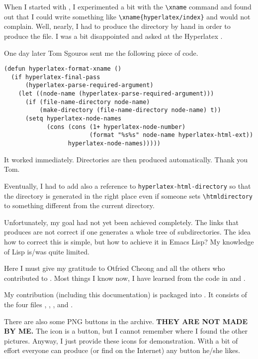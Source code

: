 When I started with \HLX{}, I experimented a bit with the
\verb'\xname' command and found out that I could write something like
\verb'\xname{hyperlatex/index}' and \HLX{} would not complain. Well,
nearly, I had to produce the directory  by hand in
order to produce the  file.
%
I was a bit disappointed and asked at the Hyperlatex
.

One day later Tom Sgouros sent me the following piece of code.
\begin{verbatim}
(defun hyperlatex-format-xname ()
  (if hyperlatex-final-pass
      (hyperlatex-parse-required-argument)
    (let ((node-name (hyperlatex-parse-required-argument)))
      (if (file-name-directory node-name)
          (make-directory (file-name-directory node-name) t))
      (setq hyperlatex-node-names
            (cons (cons (1+ hyperlatex-node-number)
                        (format "%s%s" node-name hyperlatex-html-ext))
                  hyperlatex-node-names)))))
\end{verbatim}
It worked immediately. Directories are then produced automatically.
Thank you Tom.

Eventually, I had to add also a reference to
\verb'hyperlatex-html-directory' so that the directory is generated in
the right place even if someone sets \verb'\htmldirectory' to
something different from the current directory.

Unfortunately, my goal had not yet been achieved completely. The links
that \HLX{} produces are not correct if one generates a whole tree of
subdirectories. The idea how to correct this is simple, but how to
achieve it in Emacs Lisp? My knowledge of Lisp is/was quite limited.

Here I must give my gratitude to Otfried Cheong and all the others who
contributed to \HLX{}. Most things I know now, I have learned from the
code in  and .

My contribution (including this documentation) is packaged into
. It consists of the
four files , ,
, and .

There are also some PNG buttons in the archive.
%
\textbf{THEY ARE NOT MADE BY ME.}
%
The  icon is a  button,
but I cannot remember where I found the other pictures. Anyway, I just
provide these icons for demonstration. With a bit of effort everyone
can produce (or find on the Internet) any button he/she likes.










